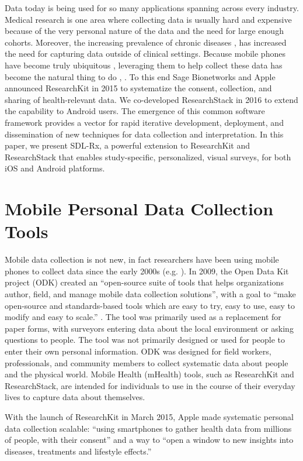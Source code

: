 \documentclass{acm_proc_article-sp}
\begin{document}
Data today is being used for so many applications spanning across every industry.
Medical research is one area where collecting data is usually hard and expensive because of the very personal nature of the data and the need for large enough cohorts. Moreover, the increasing prevalence of chronic diseases \cite{Pollak2011-mq}, \cite{Consolvo2003-xv} has increased the need for capturing data outside of clinical settings.  Because mobile phones have become truly ubiquitous , leveraging them to help collect these data has become the natural thing to do \cite{noauthor_undated-ze}, \cite{noauthor_undated-hv}.  To this end Sage Bionetworks and Apple announced ResearchKit in 2015 to systematize the consent, collection, and sharing of health-relevant data.  We co-developed ResearchStack in 2016 to extend the capability to Android users. The emergence of this common software framework provides a vector for rapid iterative development, deployment, and dissemination of new techniques for data collection and interpretation.  In this paper, we present SDL-Rx, a powerful extension to ResearchKit and ResearchStack that enables study-specific, personalized, visual surveys, for both iOS and Android platforms.


\section{Mobile Personal Data Collection Tools }
Mobile data collection is not new, in fact researchers have been using mobile phones to collect data since the early 2000s (e.g. \cite{Center_for_Disease_Control_and_Prevention_undated-ik}). In 2009, the Open Data Kit project (ODK) created an ``open-source suite of tools that helps organizations author, field, and manage mobile data collection solutions'', with a goal to ``make open-source and standards-based tools which are easy to try, easy to use, easy to modify and easy to scale.'' \cite{noauthor_undated-tj}. The tool was primarily used as a replacement for paper forms, with surveyors entering data about the local environment or asking questions to people. The tool was not primarily designed or used for people to enter their own personal information. ODK was designed for field workers, professionals, and community members to collect systematic data about people and the physical world.  Mobile Health (mHealth) tools, such as ResearchKit and ResearchStack, are intended for individuals to use in the course of their everyday lives to capture data about themselves.

With the launch of ResearchKit in March 2015, Apple made systematic personal data collection scalable: ``using smartphones to gather health data from millions of people, with their consent'' and a way to ``open a window to new insights into diseases, treatments and lifestyle effects.'' \cite{Apple_undated-rz}
\end{document}
